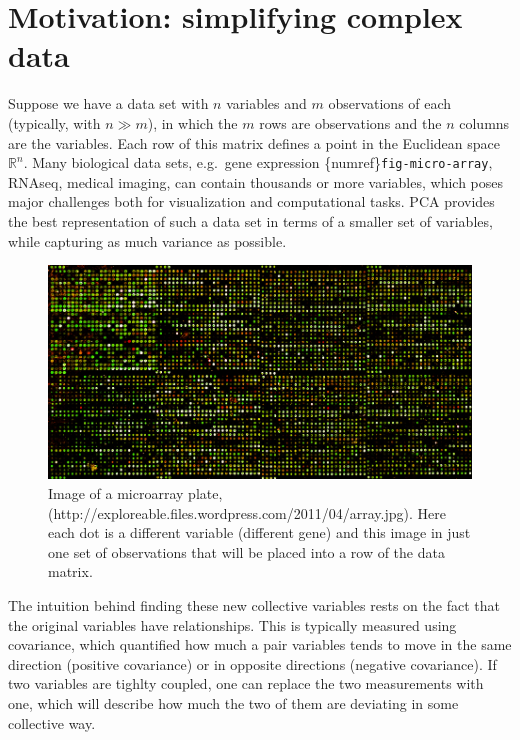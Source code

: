 \documentclass[
  letterpaper,
  DIV=11,
  numbers=noendperiod]{scrreprt}
\begin{document}
\section{Motivation: simplifying complex
data}\label{motivation-simplifying-complex-data}

Suppose we have a data set with \(n\) variables and \(m\) observations
of each (typically, with \(n \gg m\)), in which the \(m\) rows are
observations and the \(n\) columns are the variables. Each row of this
matrix defines a point in the Euclidean space \(\mathbb R^n\). Many
biological data sets, e.g.~gene expression
\{numref\}\texttt{fig-micro-array}, RNAseq, medical imaging, can contain
thousands or more variables, which poses major challenges both for
visualization and computational tasks. PCA provides the best
representation of such a data set in terms of a smaller set of
variables, while capturing as much variance as possible.

\begin{figure}[H]

{\centering \includegraphics{figs/micro_array.jpg}

}

\caption{Image of a microarray plate,
(http://exploreable.files.wordpress.com/2011/04/array.jpg). Here each
dot is a different variable (different gene) and this image in just one
set of observations that will be placed into a row of the data matrix.}

\end{figure}%

The intuition behind finding these new collective variables rests on the
fact that the original variables have relationships. This is typically
measured using covariance, which quantified how much a pair variables
tends to move in the same direction (positive covariance) or in opposite
directions (negative covariance). If two variables are tighlty coupled,
one can replace the two measurements with one, which will describe how
much the two of them are deviating in some collective way.
\end{document}

